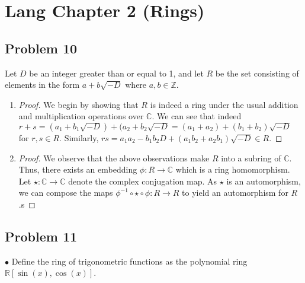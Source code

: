 \documentclass[Lang.tex]{subfiles}
\begin{document}
\section*{Lang Chapter 2 (Rings)}

\subsection{Problem 10}

Let $D$ be an integer greater than or equal to 1, and let $R$ be the set consisting of elements in the form $a + b\sqrt{-D}$ where $a,b \in \mathbb{Z}$.

\begin{enumerate}
	\item 
		\begin{proof}
			We begin by showing that $R$ is indeed a ring under the usual addition and multiplication operations over $\mathbb{C}$. We can see that indeed $r + s = (a_1 + b_1\sqrt{-D}) + (a_2 + b_2\sqrt{-D} = (a_1 + a_2) + (b_1 + b_2)\sqrt{-D}$ for $r,s \in R$. Similarly, $rs = a_1a_2 - b_1b_2D + (a_1b_2 + a_2b_1)\sqrt{-D} \in R$.
			\end{proof}
			\item
				\begin{proof}
						 We observe that the above observations make $R$ into a subring of $\mathbb{C}$. Thus, there exists an embedding $\phi: R \rightarrow \mathbb{C}$ which is a ring homomorphism. Let $\star: \mathbb{C} \rightarrow \mathbb{C}$ denote the complex conjugation map. As $\star$ is an automorphism, we can compose the maps $\phi^{-1} \circ \star \circ \phi: R \rightarrow R$ to yield an automorphism for $R$.s  
				\end{proof}
				
\end{enumerate}

\subsection*{Problem 11}
$\bullet$ Define the ring of trigonometric functions as the polynomial ring $\mathbb{R}[\sin(x),\cos(x)]$. 
\end{document}
